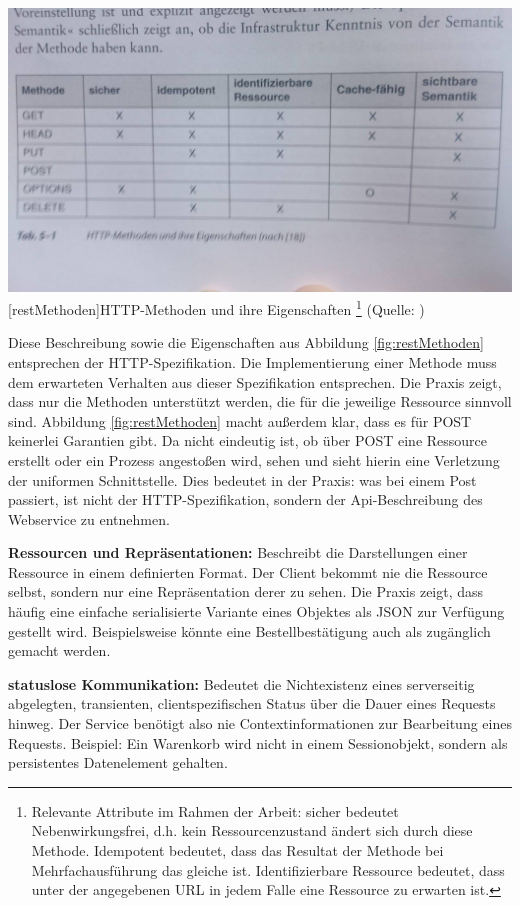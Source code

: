 \documentclass[12pt,a4paper,bibliography=totocnumbered,listof=totoc]{scrartcl}
\begin{document}
\begin{compactitem}
\vspace{1em}
\begin{minipage}{\linewidth}
	\centering
	\includegraphics[width=0.7\linewidth]{Abbildungen/restMethoden.jpg}
	[restMethoden]{HTTP-Methoden und ihre Eigenschaften
	\footnote{Relevante Attribute im Rahmen der Arbeit: \glqq sicher\grqq{} bedeutet Nebenwirkungsfrei, d.h. kein Ressourcenzustand ändert sich durch diese Methode. \glqq Idempotent\grqq{} bedeutet, dass das Resultat der Methode bei Mehrfachausführung das gleiche ist. \glqq Identifizierbare Ressource\grqq{} bedeutet, dass unter der angegebenen URL in jedem Falle eine Ressource zu erwarten ist.}
	(Quelle: \citet{tilkov11})}
	\label{fig:restMethoden}
\end{minipage}
\vspace{1em}

Diese Beschreibung sowie die Eigenschaften aus Abbildung \ref{fig:restMethoden} entsprechen der HTTP-Spezifikation. Die Implementierung einer Methode muss dem erwarteten Verhalten aus dieser Spezifikation entsprechen. Die Praxis zeigt, dass nur die Methoden unterstützt werden, die für die jeweilige Ressource sinnvoll sind. Abbildung \ref{fig:restMethoden} macht außerdem klar, dass es für POST keinerlei Garantien gibt. Da nicht eindeutig ist, ob über POST eine Ressource erstellt oder ein Prozess angestoßen wird, sehen \citeauthor{richardson07} und sieht hierin eine Verletzung der uniformen Schnittstelle. Dies bedeutet in der Praxis: was bei einem Post passiert, ist nicht der HTTP-Spezifikation, sondern der Api-Beschreibung des Webservice zu entnehmen.
\item \textbf{Ressourcen und Repräsentationen:} Beschreibt die Darstellungen einer Ressource in einem definierten Format. Der Client bekommt nie die Ressource selbst, sondern nur eine Repräsentation derer zu sehen. Die Praxis zeigt, dass häufig eine einfache serialisierte Variante eines Objektes als JSON zur Verfügung gestellt wird. Beispielsweise könnte eine Bestellbestätigung auch als zugänglich gemacht werden.
\item \textbf{statuslose Kommunikation:} Bedeutet die Nichtexistenz eines serverseitig abgelegten, transienten, clientspezifischen Status über die Dauer eines Requests hinweg. Der Service benötigt also nie Contextinformationen zur Bearbeitung eines Requests. Beispiel: Ein Warenkorb wird nicht in einem Sessionobjekt, sondern als persistentes Datenelement gehalten.
\end{compactitem}
\end{document}
